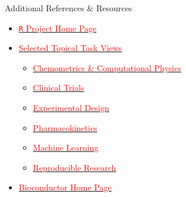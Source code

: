 \documentclass[aspectratio=169]{beamer}\usepackage[]{graphicx}\usepackage[]{color}
\begin{document}
\begin{frame}{Additional References \& Resources}
  \begin{itemize}
    \item \href{https://www.r-project.org/}{\textcolor{red}{\texttt{R} Project Home Page}}
    \item  \href{https://cran.r-project.org/web/views/}{\textcolor{red}{Selected Topical Task Views}}
      \begin{itemize}
        \item \href{https://cran.r-project.org/web/views/ChemPhys.html}{\textcolor{red}{Chemometrics \& Computational Physics}}
        \item \href{https://cran.r-project.org/web/views/ClinicalTrials.html}{\textcolor{red}{Clinical Trials}}
        \item \href{https://cran.r-project.org/web/views/ExperimentalDesign.html}{\textcolor{red}{Experimental Design}}
        \item \href{https://cran.r-project.org/web/views/Pharmacokinetics.html}{\textcolor{red}{Pharmacokinetics}}
        \item \href{https://cran.r-project.org/web/views/MachineLearning.html}{\textcolor{red}{Machine Learning}}
        \item \href{https://cran.r-project.org/web/views/ReproducibleResearch.html}{\textcolor{red}{Reproducible Research}}
      \end{itemize}
    \item  \href{https://bioconductor.org/}{\textcolor{red}{Bioconductor Home Page}}
  \end{itemize}
\end{frame}
\end{document}

